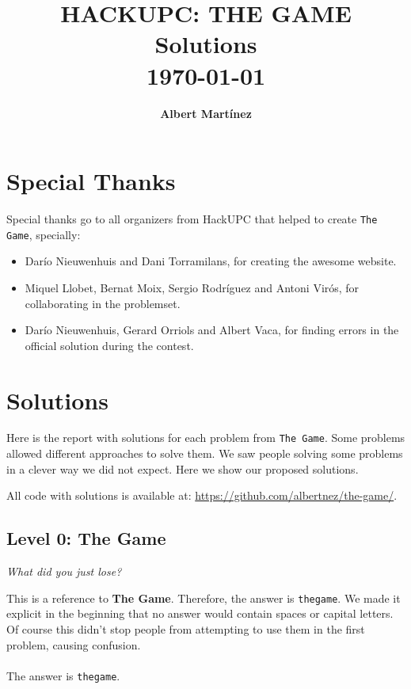\documentclass[paper=a4, fontsize=11pt]{scrartcl}	%
\title{						%
			\LARGE \textbf{\uppercase{HackUPC: The Game}\\Solutions}	%
			\HRule{2pt} \\ [0.5cm]		%
			\normalsize \today			%
		}
\author{
		\textbf{\large{Albert Martínez}}\\[0.3cm]
}
\makeatletter
\def\printtitle{%
    {\centering \@title\par}}
\def\printauthor{%
    {\centering \large \@author}}
\makeatother
\begin{document}
\thispagestyle{empty}		%

\printtitle					%
  	\vfill
\printauthor				%
\newpage
\tableofcontents 			%

\newpage

\section{Special Thanks}
Special thanks go to all organizers from HackUPC that helped to create \texttt{The Game}, specially:
\begin{itemize}
\item Darío Nieuwenhuis and Dani Torramilans, for creating the awesome website.
\item Miquel Llobet, Bernat Moix, Sergio Rodríguez and Antoni Virós, for collaborating in the problemset.
\item Darío Nieuwenhuis, Gerard Orriols and Albert Vaca, for finding errors in the official solution during the contest.
\end{itemize}


\clearpage
\section{Solutions}
Here is the report with solutions for each problem from \texttt{The Game}. Some problems allowed different approaches to solve them. We saw people solving some problems in a clever way we did not expect. Here we show our proposed solutions.

All code with solutions is available at: \url{https://github.com/albertnez/the-game/}.



{}
\subsection*{Level 0: The Game}
\textit{What did you just lose?}

This is a reference to \textbf{The Game}. Therefore, the answer is \texttt{thegame}.
We made it explicit in the beginning that no answer would contain spaces or capital letters. Of course this didn't stop people from attempting to use them in the first problem, causing confusion.
\\
\\
The answer is \texttt{thegame}.
\end{document}

